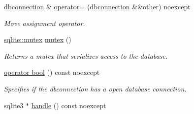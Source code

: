 \begin{DoxyCompactItemize}
\hyperlink{a00004}{dbconnection} \& \hyperlink{a00004_abd91c727842023d54fdb64e6e2e9ac3c}{operator=} (\hyperlink{a00004}{dbconnection} \&\&other) noexcept
\begin{DoxyCompactList}\small\item\em Move assignment operator. \end{DoxyCompactList}\item 
\hyperlink{a00009}{sqlite\-::mutex} \hyperlink{a00004_afa13431e657c74ba7beee63fa70eeb93}{mutex} ()
\begin{DoxyCompactList}\small\item\em Returns a mutex that serializes access to the database. \end{DoxyCompactList}\item 
\hyperlink{a00004_a8c0e145b3687659ec0f76949174651e0}{operator bool} () const noexcept
\begin{DoxyCompactList}\small\item\em Specifies if the dbconnection has a open database connection. \end{DoxyCompactList}\item 
\hypertarget{a00004_a1a9b022293133991f265c10c1f50800b}{sqlite3 $\ast$ \hyperlink{a00004_a1a9b022293133991f265c10c1f50800b}{handle} () const noexcept}\label{a00004_a1a9b022293133991f265c10c1f50800b}


\end{DoxyCompactItemize}
